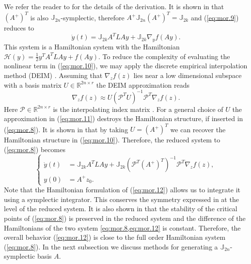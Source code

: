 We refer the reader to \cite{doi:10.1137/17M1111991} for the details of the derivation. It is shown in \cite{doi:10.1137/140978922} that $(A^+)^T$ is also $\mathbb J_{2n}$-symplectic, therefore $A^+ \mathbb J_{2n} (A^+)^T = \mathbb J_{2k}$ and (\ref{eq:mor.9}) reduces to
\begin{equation} \label{eq:mor.10}
	\dot y(t) = \mathbb J_{2k} A^T L A y + \mathbb J_{2k} \nabla_y f(Ay).
\end{equation}
This system is a Hamiltonian system with the Hamiltonian $\mathcal H(y) = \frac 1 2 y^T A^T L A y + f(Ay)$. To reduce the complexity of evaluating the nonlinear term in (\ref{eq:mor.10}), we may apply the discrete empirical interpolation method (DEIM) \cite{barrault2004empirical,Chaturantabut:2010cz,wirtz2014posteriori}. Assuming that $\nabla_z f(z)$ lies near a low dimensional subspace with a basis matrix $U\in \mathbb R^{2n\times r}$ the DEIM approximation reads
\begin{equation} \label{eq:mor.11}
	\nabla_z f(z) \approx U (\mathcal P^T U)^{-1} \mathcal P^T \nabla_z f(z).
\end{equation}
Here $\mathcal P \in \mathbb R^{2n\times r}$ is the interpolating index matrix \cite{Chaturantabut:2010cz}. For a general choice of $U$ the approximation in (\ref{eq:mor.11}) destroys the Hamiltonian structure, if inserted in (\ref{eq:mor.8}). It is shown in \cite{doi:10.1137/17M1111991} that by taking $U = (A^+)^T$ we can recover the Hamiltonian structure in (\ref{eq:mor.10}). Therefore, the reduced system to (\ref{eq:mor.8}) becomes
\begin{equation} \label{eq:mor.12}
\left\{
\begin{aligned}
	\dot y(t) &= \mathbb J_{2k} A^T L A y + \mathbb J_{2k} (\mathcal P^T (A^+)^T)^{-1} \mathcal P^T \nabla_z f(z), \\
	y(0) &= A^+ z_0.
\end{aligned}
\right.
\end{equation}
Note that the Hamiltonian formulation of (\ref{eq:mor.12}) allows us to integrate it using a symplectic integrator. This conserves the symmetry expressed in  at the level of the reduced system. It is also shown in \cite{doi:10.1137/17M1111991,doi:10.1137/140978922} that the stability of the critical points of (\ref{eq:mor.8}) is preserved in the reduced system and the difference of the Hamiltonians of the two system \cref{eq:mor.8,eq:mor.12} is constant. Therefore, the overall behavior (\ref{eq:mor.12}) is close to the full order Hamiltonian system (\ref{eq:mor.8}). In the next subsection we discuss methods for generating a $\mathbb J_{2n}$-symplectic basis $A$.

